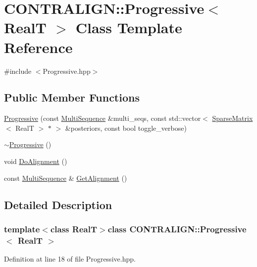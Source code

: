 \hypertarget{class_c_o_n_t_r_a_l_i_g_n_1_1_progressive}{\section{C\+O\+N\+T\+R\+A\+L\+I\+G\+N\+:\+:Progressive$<$ Real\+T $>$ Class Template Reference}
\label{class_c_o_n_t_r_a_l_i_g_n_1_1_progressive}
}


{\ttfamily \#include $<$Progressive.\+hpp$>$}

\subsection*{Public Member Functions}
\begin{DoxyCompactItemize}
\item 
\hyperlink{class_c_o_n_t_r_a_l_i_g_n_1_1_progressive_ab7475b795a4e8f7c23b64bd69ad1fca4}{Progressive} (const \hyperlink{class_c_o_n_t_r_a_l_i_g_n_1_1_multi_sequence}{Multi\+Sequence} \&multi\+\_\+seqs, const std\+::vector$<$ \hyperlink{class_c_o_n_t_r_a_l_i_g_n_1_1_sparse_matrix}{Sparse\+Matrix}$<$ Real\+T $>$ $\ast$ $>$ \&posteriors, const bool toggle\+\_\+verbose)
\item 
\hyperlink{class_c_o_n_t_r_a_l_i_g_n_1_1_progressive_ac8444df099c393dfc38f80e0c21ca16b}{$\sim$\+Progressive} ()
\item 
void \hyperlink{class_c_o_n_t_r_a_l_i_g_n_1_1_progressive_a069b4945d754c644842fbc0df8a78fb6}{Do\+Alignment} ()
\item 
const \hyperlink{class_c_o_n_t_r_a_l_i_g_n_1_1_multi_sequence}{Multi\+Sequence} \& \hyperlink{class_c_o_n_t_r_a_l_i_g_n_1_1_progressive_ab0e037b634cc5dd116b94135495b5712}{Get\+Alignment} ()
\end{DoxyCompactItemize}


\subsection{Detailed Description}
\subsubsection*{template$<$class Real\+T$>$class C\+O\+N\+T\+R\+A\+L\+I\+G\+N\+::\+Progressive$<$ Real\+T $>$}



Definition at line 18 of file Progressive.\+hpp.



